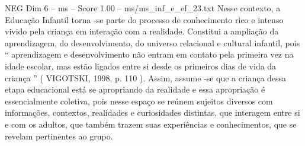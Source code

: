 \begin{textsample}{NEG Dim 6 – ms – Score 1.00 – ms/ms\_inf\_e\_ef\_23.txt}
Nesse contexto, a Educação Infantil torna -se parte do processo de conhecimento rico e intenso vivido pela criança em interação com a realidade.
Constitui a ampliação da aprendizagem, do desenvolvimento, do universo relacional e cultural infantil, pois “ aprendizagem e desenvolvimento não entram em contato pela primeira vez na idade escolar, mas estão ligados entre si desde os primeiros dias de vida da criança ” ( VIGOTSKI, 1998, p. 110 ).
Assim, assume -se que a criança dessa etapa educacional está se apropriando da realidade e essa apropriação é essencialmente coletiva, pois nesse espaço se reúnem sujeitos diversos com informações, contextos, realidades e curiosidades distintas, que interagem entre si e com os adultos, que também trazem suas experiências e conhecimentos, que se revelam pertinentes ao grupo.

\end{textsample}
